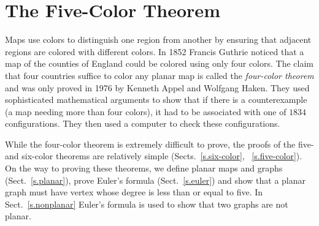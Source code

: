 

\chapter{The Five-Color Theorem}\label{c.five}




Maps use colors to distinguish one region from another by ensuring that adjacent regions are colored with different colors. In 1852 Francis Guthrie noticed that a map of the counties of England could be colored using only four colors. The claim that four countries suffice to color any planar map is called the \emph{four-color theorem} and was only proved in 1976 by Kenneth Appel and Wolfgang Haken. They used sophisticated mathematical arguments to show that if there is a counterexample (a map needing more than four colors), it had to be associated with one of $1834$ configurations. They then used a computer to check these configurations.

While the four-color theorem is extremely difficult to prove, the proofs of the five- and six-color theorems are relatively simple (Sects.~\ref{s.six-color}, ~\ref{s.five-color}). On the way to proving these theorems, we define planar maps and graphs (Sect.~\ref{s.planar}), prove Euler's formula (Sect.~\ref{s.euler}) and show that a planar graph must have vertex whose degree is less than or equal to five. In Sect.~\ref{s.nonplanar} Euler's formula is used to show that two graphs are not planar.

